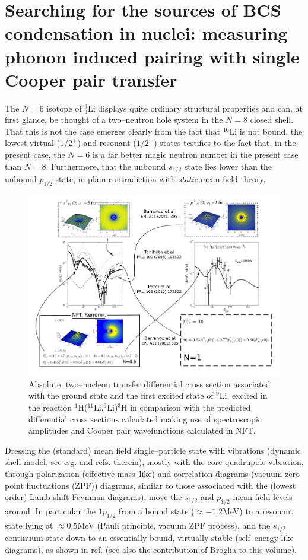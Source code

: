 \documentclass[a4paper,14pt]{book}
\begin{document}
\section{Searching for the sources of BCS condensation in nuclei: measuring phonon induced pairing with single Cooper pair transfer}


The $N=6$ isotope of $_3^9$Li displays quite ordinary structural properties and can, at first glance, be thought of a two--neutron hole system in the $N=8$ closed shell. That this is not the case emerges clearly from the fact that $^{10}$Li is not bound, the lowest virtual ($1/2^+$) and resonant ($1/2^-$) states testifies to the fact that, in the present case, the $N=6$ is a far better magic neutron number in the present case than $N=8$. Furthermore, that the unbound $s_{1/2}$ state lies lower than the unbound $p_{1/2}$ state, in plain contradiction with \textit{static} mean field theory.

\begin{figure}
\centerline{\includegraphics*[width=15cm,angle=0]{figs_C4S/fig11}}
\caption{Absolute, two--nucleon transfer differential cross section associated with the ground state and the first 	excited state of $^9$Li, excited\cite{Tanihata:08} in the reaction $^1$H($^{11}$Li,$^9$Li)$^3$H\cite{Tanihata:08} in comparison with the predicted differential cross sections\cite{Potel:10} calculated making use of spectroscopic amplitudes and Cooper pair wavefunctions calculated in NFT.}\label{fig11}
\end{figure}
Dressing the (standard) mean field single--particle state with vibrations (dynamic shell model, see e.g. \cite{Mahaux:85} and refs. therein), mostly with the core quadrupole vibration, through polarization (effective mass--like) and correlation diagrams (vacuum zero point fluctuations (ZPF)) diagrams, similar to those associated with the (lowest order) Lamb shift Feynman diagrams), move the ${s}_{1/2}$ and ${p}_{1/2}$ mean field levels around. In particular the $1p_{1/2}$ from a bound state ($\approx -1.2$MeV) to a resonant state lying at $\approx 0.5$MeV (Pauli principle, vacuum ZPF process), and the $s_{1/2}$ continuum state down to an essentially bound, virtually stable (self--energy like diagrams), as  shown in ref.\cite{Barranco:01} (see also the contribution of Broglia to this volume).
\end{document}
